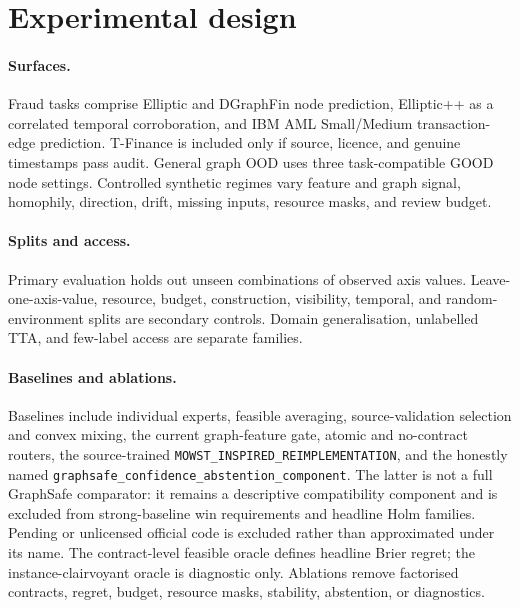 \section{Experimental design}

\paragraph{Surfaces.}
Fraud tasks comprise Elliptic and DGraphFin node prediction, Elliptic++ as a
correlated temporal corroboration, and IBM AML Small/Medium transaction-edge
prediction. T-Finance is included only if source, licence, and genuine
timestamps pass audit. General graph OOD uses three task-compatible GOOD node
settings. Controlled synthetic regimes vary feature and graph signal,
homophily, direction, drift, missing inputs, resource masks, and review budget.

\paragraph{Splits and access.}
Primary evaluation holds out unseen combinations of observed axis values.
Leave-one-axis-value, resource, budget, construction, visibility, temporal, and
random-environment splits are secondary controls. Domain generalisation,
unlabelled TTA, and few-label access are separate families.

\paragraph{Baselines and ablations.}
Baselines include individual experts, feasible averaging, source-validation
selection and convex mixing, the current graph-feature gate, atomic and
no-contract routers, the source-trained
\texttt{MOWST\_\allowbreak{}INSPIRED\_\allowbreak{}REIMPLEMENTATION}, and the
honestly named
\texttt{graphsafe\_\allowbreak{}confidence\_\allowbreak{}abstention\_\allowbreak{}component}.
The latter is not a full GraphSafe comparator: it remains a descriptive
compatibility component and is excluded from strong-baseline win requirements
and headline Holm families. Pending or unlicensed official code is excluded
rather than approximated under its name. The contract-level feasible oracle
defines headline Brier regret; the instance-clairvoyant oracle is diagnostic
only.
Ablations remove factorised contracts, regret, budget, resource masks,
stability, abstention, or diagnostics.

